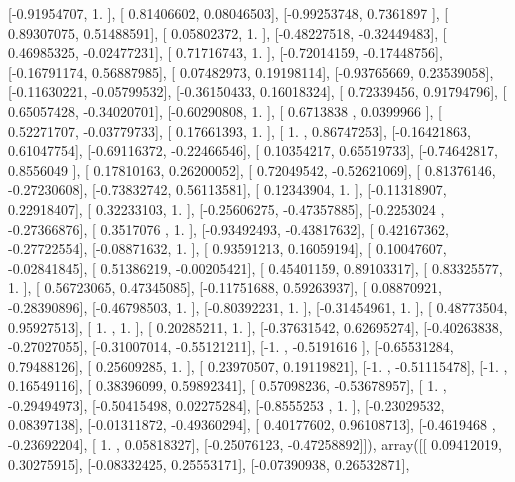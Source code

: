 \documentclass{article}
\begin{document}
       [-0.91954707,  1.        ],
       [ 0.81406602,  0.08046503],
       [-0.99253748,  0.7361897 ],
       [ 0.89307075,  0.51488591],
       [ 0.05802372,  1.        ],
       [-0.48227518, -0.32449483],
       [ 0.46985325, -0.02477231],
       [ 0.71716743,  1.        ],
       [-0.72014159, -0.17448756],
       [-0.16791174,  0.56887985],
       [ 0.07482973,  0.19198114],
       [-0.93765669,  0.23539058],
       [-0.11630221, -0.05799532],
       [-0.36150433,  0.16018324],
       [ 0.72339456,  0.91794796],
       [ 0.65057428, -0.34020701],
       [-0.60290808,  1.        ],
       [ 0.6713838 ,  0.0399966 ],
       [ 0.52271707, -0.03779733],
       [ 0.17661393,  1.        ],
       [ 1.        ,  0.86747253],
       [-0.16421863,  0.61047754],
       [-0.69116372, -0.22466546],
       [ 0.10354217,  0.65519733],
       [-0.74642817,  0.8556049 ],
       [ 0.17810163,  0.26200052],
       [ 0.72049542, -0.52621069],
       [ 0.81376146, -0.27230608],
       [-0.73832742,  0.56113581],
       [ 0.12343904,  1.        ],
       [-0.11318907,  0.22918407],
       [ 0.32233103,  1.        ],
       [-0.25606275, -0.47357885],
       [-0.2253024 , -0.27366876],
       [ 0.3517076 ,  1.        ],
       [-0.93492493, -0.43817632],
       [ 0.42167362, -0.27722554],
       [-0.08871632,  1.        ],
       [ 0.93591213,  0.16059194],
       [ 0.10047607, -0.02841845],
       [ 0.51386219, -0.00205421],
       [ 0.45401159,  0.89103317],
       [ 0.83325577,  1.        ],
       [ 0.56723065,  0.47345085],
       [-0.11751688,  0.59263937],
       [ 0.08870921, -0.28390896],
       [-0.46798503,  1.        ],
       [-0.80392231,  1.        ],
       [-0.31454961,  1.        ],
       [ 0.48773504,  0.95927513],
       [ 1.        ,  1.        ],
       [ 0.20285211,  1.        ],
       [-0.37631542,  0.62695274],
       [-0.40263838, -0.27027055],
       [-0.31007014, -0.55121211],
       [-1.        , -0.5191616 ],
       [-0.65531284,  0.79488126],
       [ 0.25609285,  1.        ],
       [ 0.23970507,  0.19119821],
       [-1.        , -0.51115478],
       [-1.        ,  0.16549116],
       [ 0.38396099,  0.59892341],
       [ 0.57098236, -0.53678957],
       [ 1.        , -0.29494973],
       [-0.50415498,  0.02275284],
       [-0.8555253 ,  1.        ],
       [-0.23029532,  0.08397138],
       [-0.01311872, -0.49360294],
       [ 0.40177602,  0.96108713],
       [-0.4619468 , -0.23692204],
       [ 1.        ,  0.05818327],
       [-0.25076123, -0.47258892]]), array([[ 0.09412019,  0.30275915],
       [-0.08332425,  0.25553171],
       [-0.07390938,  0.26532871],
\end{document}
